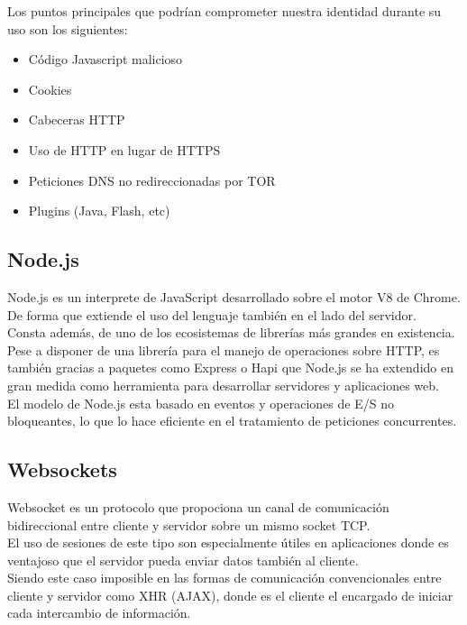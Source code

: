 Los puntos principales que podrían comprometer nuestra identidad durante su uso son los siguientes: \\

\begin{itemize}  
	\item  Código Javascript malicioso
	\item  Cookies
	\item  Cabeceras HTTP
	\item  Uso de HTTP en lugar de HTTPS
	\item Peticiones DNS no redireccionadas por TOR
	\item  Plugins (Java, Flash, etc)
\end{itemize}

\subsection {Node.js}

Node.js es un interprete de JavaScript desarrollado sobre el motor V8 de Chrome. De forma que extiende el uso del lenguaje también en el lado del servidor. \\
Consta además, de uno de los ecosistemas de librerías más grandes en existencia. \\

Pese a disponer de una librería para el manejo de operaciones sobre HTTP, es también gracias a paquetes como Express o Hapi que Node.js se ha extendido en gran medida como herramienta para desarrollar servidores y aplicaciones web. \\
El modelo de Node.js esta basado en eventos y operaciones de E/S no bloqueantes, lo que lo hace eficiente en el tratamiento de peticiones concurrentes.

\subsection {Websockets}

Websocket es un protocolo que propociona un canal de comunicación bidireccional entre cliente y servidor sobre un mismo socket TCP. \\
El uso de sesiones de este tipo son especialmente útiles en aplicaciones donde es ventajoso que el servidor pueda enviar datos también al cliente. \\
Siendo este caso imposible en las formas de comunicación convencionales entre cliente y servidor como XHR (AJAX), donde es el cliente el encargado de iniciar cada intercambio de información. \\


